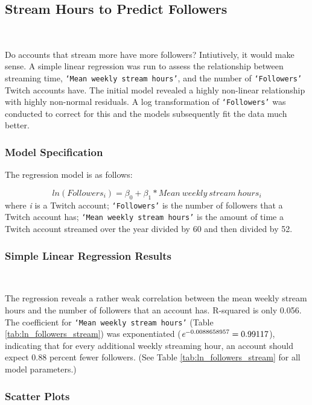\documentclass[12pt]{article}
\begin{document}
\subsection{Stream Hours to Predict Followers}\

Do accounts that stream more have more followers? Intiutively, it would make sense. A simple linear regression was run to assess the relationship between streaming time, \texttt{`Mean weekly stream hours'}, and the number of \texttt{`Followers'} Twitch accounts have. The initial model revealed a highly non-linear relationship with highly non-normal residuals. A log transformation of \texttt{`Followers'} was conducted to correct for this and the models subsequently fit the data much better.

\subsubsection{Model Specification}
The regression model is as follows:

\begin{equation}
	ln(Followers_{i}) = \beta_{0} + \beta_{1} \ast Mean\ weekly\ stream\ hours_{i}
	\label{eq:ln_followers_stream}
\end{equation}
where \emph{i} is a Twitch account; \texttt{`Followers'} is the number of followers that a Twitch account has; \texttt{`Mean weekly stream hours'} is the amount of time a Twitch account streamed over the year divided by 60 and then divided by 52.

\subsubsection{Simple Linear Regression Results}\

The regression reveals a rather weak correlation between the mean weekly stream hours and the number of followers that an account has. R-squared is only 0.056. The coefficient for \texttt{`Mean weekly stream hours'} (Table \ref{tab:ln_followers_stream}) was exponentiated ($\emph{e}^{-0.0088658957} = 0.99117$), indicating that for every additional weekly streaming hour, an account should expect 0.88 percent fewer followers. (See Table \ref{tab:ln_followers_stream} for all model parameters.)

\subsubsection{Scatter Plots}
\end{document}
